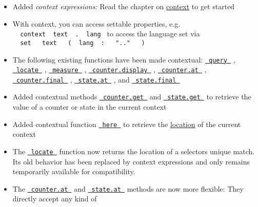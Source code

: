 \begin{itemize}
\tightlist
\item
  Added \emph{context expressions:} Read the chapter on
  \href{/docs/reference/context/}{context} to get started
\item
  With context, you can access settable properties, e.g.
  \texttt{\ }{\texttt{\ context\ }}\texttt{\ text\ }{\texttt{\ .\ }}\texttt{\ lang\ }
  to access the language set via
  \texttt{\ }{\texttt{\ set\ }}\texttt{\ }{\texttt{\ text\ }}\texttt{\ }{\texttt{\ (\ }}\texttt{\ lang\ }{\texttt{\ :\ }}\texttt{\ }{\texttt{\ ".."\ }}\texttt{\ }{\texttt{\ )\ }}\texttt{\ }
\item
  The following existing functions have been made contextual:
  \href{/docs/reference/introspection/query/}{\texttt{\ query\ }} ,
  \href{/docs/reference/introspection/locate/}{\texttt{\ locate\ }} ,
  \href{/docs/reference/layout/measure/}{\texttt{\ measure\ }} ,
  \href{/docs/reference/introspection/counter/\#definitions-display}{\texttt{\ counter.display\ }}
  ,
  \href{/docs/reference/introspection/counter/\#definitions-at}{\texttt{\ counter.at\ }}
  ,
  \href{/docs/reference/introspection/counter/\#definitions-final}{\texttt{\ counter.final\ }}
  ,
  \href{/docs/reference/introspection/state/\#definitions-at}{\texttt{\ state.at\ }}
  , and
  \href{/docs/reference/introspection/state/\#definitions-final}{\texttt{\ state.final\ }}
\item
  Added contextual methods
  \href{/docs/reference/introspection/counter/\#definitions-get}{\texttt{\ counter.get\ }}
  and
  \href{/docs/reference/introspection/state/\#definitions-get}{\texttt{\ state.get\ }}
  to retrieve the value of a counter or state in the current context
\item
  Added contextual function
  \href{/docs/reference/introspection/here/}{\texttt{\ here\ }} to
  retrieve the \href{/docs/reference/introspection/location/}{location}
  of the current context
\item
  The \href{/docs/reference/introspection/locate/}{\texttt{\ locate\ }}
  function now returns the location of a selector\textquotesingle s
  unique match. Its old behavior has been replaced by context
  expressions and only remains temporarily available for compatibility.
\item
  The
  \href{/docs/reference/introspection/counter/\#definitions-at}{\texttt{\ counter.at\ }}
  and
  \href{/docs/reference/introspection/state/\#definitions-at}{\texttt{\ state.at\ }}
  methods are now more flexible: They directly accept any kind of

\end{itemize}
